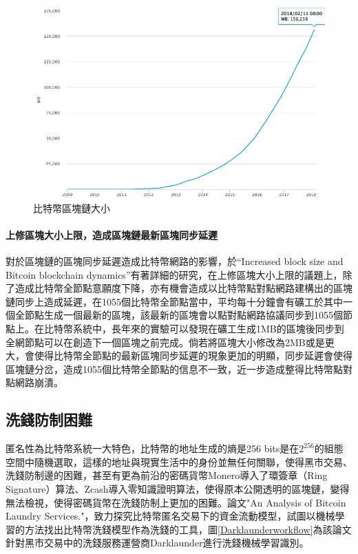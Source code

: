 			\begin{figure}[h]
				\centering
				\includegraphics[width = .7\textwidth]{blockchainsize.png}
				\caption{比特幣區塊鏈大小\supercite{blockchainsize}}\label{blockchainsize}
			\end{figure}

			\paragraph{上修區塊大小上限，造成區塊鏈最新區塊同步延遲}
			對於區塊鏈的區塊同步延遲造成比特幣網路的影響，於“Increased block size and Bitcoin blockchain dynamics”\supercite{TelecommunicationNetworksandApplicationsConferenceITNAC201727thInternational}有著詳細的研究，在上修區塊大小上限的議題上，除了造成比特幣全節點意願度下降，亦有機會造成以比特幣點對點網路建構出的區塊鏈同步上造成延遲，在1055個比特幣全節點當中，平均每十分鐘會有礦工於其中一個全節點生成一個最新的區塊，該最新的區塊會以點對點網路協議同步到1055個節點上。在比特幣系統中，長年來的實驗可以發現在礦工生成1MB的區塊後同步到全網節點可以在創造下一個區塊之前完成。倘若將區塊大小修改為2MB或是更大，會使得比特幣全節點的最新區塊同步延遲的現象更加的明顯，同步延遲會使得區塊鏈分岔，造成1055個比特幣全節點的信息不一致，近一步造成整得比特幣點對點網路崩潰。

		\subsection{洗錢防制困難}
		匿名性為比特幣系統一大特色，比特幣的地址生成的熵是256 bits是在$2^{256}$的組態空間中隨機選取，這樣的地址與現實生活中的身份並無任何關聯，使得黑市交易、洗錢防制邊的困難，甚至有更為前沿的密碼貨幣Monero\supercite{monero}導入了環簽章（Ring Signature）\supercite{Thresholdringsignaturesandapplicationstoad-hocgroups}算法、Zcash導入零知識證明算法\supercite{Zero-KnowledgeProofsofIdentity}，使得原本公開透明的區塊鏈，變得無法檢視，使得密碼貨幣在洗錢防制上更加的困難。論文"An Analysis of Bitcoin Laundry Services."\supercite{AnAnalysisofBitcoinLaundryServices}，致力探究比特幣匿名交易下的資金流動模型，試圖以機械學習的方法找出比特幣洗錢模型作為洗錢的工具，圖\ref{Darklaunderworkflow}為該論文針對黑市交易中的洗錢服務運營商Darklaunder進行洗錢機械學習識別。

